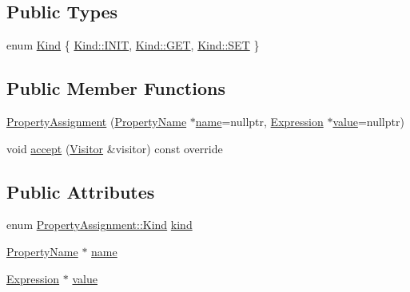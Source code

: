 \subsection*{Public Types}
\begin{DoxyCompactItemize}
\item 
enum \hyperlink{struct_property_assignment_a123a67b3e1b5d04a4a34b8d528e9fc96}{Kind} \{ \hyperlink{struct_property_assignment_a123a67b3e1b5d04a4a34b8d528e9fc96afaee4ca3c30ee18148ce3ada37466498}{Kind\+::\+I\+N\+IT}, 
\hyperlink{struct_property_assignment_a123a67b3e1b5d04a4a34b8d528e9fc96a7528035a93ee69cedb1dbddb2f0bfcc8}{Kind\+::\+G\+ET}, 
\hyperlink{struct_property_assignment_a123a67b3e1b5d04a4a34b8d528e9fc96a8c52684db8f49511e9b44471716bf164}{Kind\+::\+S\+ET}
 \}
\end{DoxyCompactItemize}
\subsection*{Public Member Functions}
\begin{DoxyCompactItemize}
\item 
\hyperlink{struct_property_assignment_a6a41f643e0d85393fac554276a550294}{Property\+Assignment} (\hyperlink{struct_property_name}{Property\+Name} $\ast$\hyperlink{struct_property_assignment_a5e0dc6f37850bd4ae74b811f6548e376}{name}=nullptr, \hyperlink{struct_expression}{Expression} $\ast$\hyperlink{struct_property_assignment_a4da33511737b9d611a62e4bca3d02324}{value}=nullptr)
\item 
void \hyperlink{struct_property_assignment_aaf11e7373f4d7863802c51548ce22317}{accept} (\hyperlink{struct_visitor}{Visitor} \&visitor) const override
\end{DoxyCompactItemize}
\subsection*{Public Attributes}
\begin{DoxyCompactItemize}
\item 
enum \hyperlink{struct_property_assignment_a123a67b3e1b5d04a4a34b8d528e9fc96}{Property\+Assignment\+::\+Kind} \hyperlink{struct_property_assignment_a7cb6c2f32adf600bb23564cfe6dc0463}{kind}
\item 
\hyperlink{struct_property_name}{Property\+Name} $\ast$ \hyperlink{struct_property_assignment_a5e0dc6f37850bd4ae74b811f6548e376}{name}
\item 
\hyperlink{struct_expression}{Expression} $\ast$ \hyperlink{struct_property_assignment_a4da33511737b9d611a62e4bca3d02324}{value}
\end{DoxyCompactItemize}



